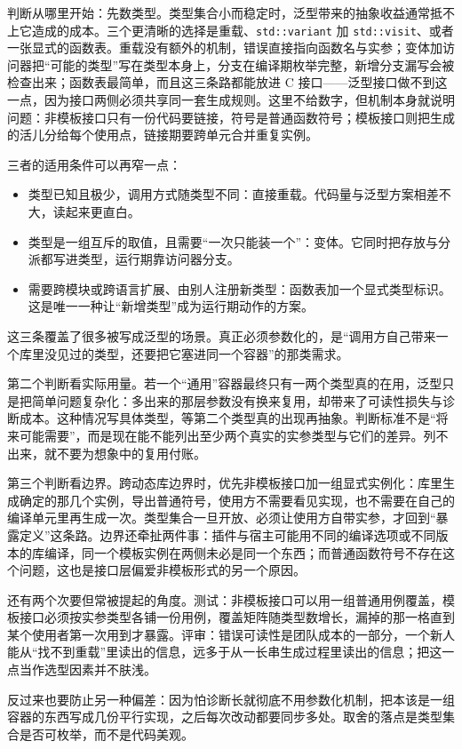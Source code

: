 \documentclass[12pt,a4paper,fontset=fandol]{ctexbook}
\newcommand{\kw}[1]{\texttt{#1}}
\begin{document}
判断从哪里开始：先数类型。类型集合小而稳定时，泛型带来的抽象收益通常抵不上它造成的成本。三个更清晰的选择是重载、\kw{std::variant} 加 \kw{std::visit}\allowbreak{}、或者一张显式的函数表。重载没有额外的机制，错误直接指向函数名与实参；变体加访问器把“可能的类型”写在类型本身上，分支在编译期枚举完整，新增分支漏写会被检查出来；函数表最简单，而且这三条路都能放进 C 接口——泛型接口做不到这一点，因为接口两侧必须共享同一套生成规则。这里不给数字，但机制本身就说明问题：非模板接口只有一份代码要链接，符号是普通函数符号；模板接口则把生成的活儿分给每个使用点，链接期要跨单元合并重复实例。

三者的适用条件可以再窄一点：
\begin{itemize}
\item 类型已知且极少，调用方式随类型不同：直接重载。代码量与泛型方案相差不大，读起来更直白。
\item 类型是一组互斥的取值，且需要“一次只能装一个”：变体。它同时把存放与分派都写进类型，运行期靠访问器分支。
\item 需要跨模块或跨语言扩展、由别人注册新类型：函数表加一个显式类型标识。这是唯一一种让“新增类型”成为运行期动作的方案。
\end{itemize}

这三条覆盖了很多被写成泛型的场景。真正必须参数化的，是“调用方自己带来一个库里没见过的类型，还要把它塞进同一个容器”的那类需求。

第二个判断看实际用量。若一个“通用”容器最终只有一两个类型真的在用，泛型只是把简单问题复杂化：多出来的那层参数没有换来复用，却带来了可读性损失与诊断成本。这种情况写具体类型，等第二个类型真的出现再抽象。判断标准不是“将来可能需要”，而是现在能不能列出至少两个真实的实参类型与它们的差异。列不出来，就不要为想象中的复用付账。

第三个判断看边界。跨动态库边界时，优先非模板接口加一组显式实例化：库里生成确定的那几个实例，导出普通符号，使用方不需要看见实现，也不需要在自己的编译单元里再生成一次。类型集合一旦开放、必须让使用方自带实参，才回到“暴露定义”这条路。边界还牵扯两件事：插件与宿主可能用不同的编译选项或不同版本的库编译，同一个模板实例在两侧未必是同一个东西；而普通函数符号不存在这个问题，这也是接口层偏爱非模板形式的另一个原因。

还有两个次要但常被提起的角度。测试：非模板接口可以用一组普通用例覆盖，模板接口必须按实参类型各铺一份用例，覆盖矩阵随类型数增长，漏掉的那一格直到某个使用者第一次用到才暴露。评审：错误可读性是团队成本的一部分，一个新人能从“找不到重载”里读出的信息，远多于从一长串生成过程里读出的信息；把这一点当作选型因素并不肤浅。

反过来也要防止另一种偏差：因为怕诊断长就彻底不用参数化机制，把本该是一组容器的东西写成几份平行实现，之后每次改动都要同步多处。取舍的落点是类型集合是否可枚举，而不是代码美观。
\end{document}
